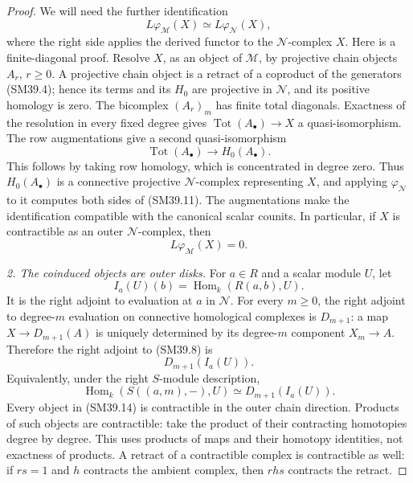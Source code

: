 \begin{proof}
We will need the further identification
\[
       L\varphi_{\mathcal M}(X)
                         \simeq L\varphi_{\mathcal N}(X),     \tag{SM39.11}
\]
where the right side applies the derived functor to the
\(\mathcal N\)-complex \(X\).  Here is a finite-diagonal
proof.  Resolve \(X\), as an object of \(\mathcal M\), by
projective chain objects \(A_r\), \(r\ge0\).  A projective
chain object is a retract of a coproduct of the generators
(SM39.4); hence its terms and its \(H_0\) are projective
in \(\mathcal N\), and its positive homology is zero.
The bicomplex \((A_r)_m\) has finite total diagonals.
Exactness of the resolution in every fixed degree gives
\(\operatorname{Tot}(A_\bullet)\to X\) a quasi-isomorphism.
The row augmentations give a second quasi-isomorphism
\[
          \operatorname{Tot}(A_\bullet)
                            \longrightarrow H_0(A_\bullet).
\]
This follows by taking row homology, which is concentrated
in degree zero.  Thus \(H_0(A_\bullet)\) is a connective
projective \(\mathcal N\)-complex representing \(X\), and
applying \(\varphi_{\mathcal N}\) to it computes both sides
of (SM39.11).  The augmentations make the identification
compatible with the canonical scalar counits.  In particular,
if \(X\) is contractible as an outer \(\mathcal N\)-complex,
then
\[
                            L\varphi_{\mathcal M}(X)=0.       \tag{SM39.12}
\]

\emph{2. The coinduced objects are outer disks.}
For \(a\in R\) and a scalar module \(U\), let
\[
             I_a(U)(b)=\operatorname{Hom}_k(R(a,b),U).
\]
It is the right adjoint to evaluation at \(a\) in
\(\mathcal N\).  For every \(m\ge0\), the right adjoint
to degree-\(m\) evaluation on connective homological
complexes is \(D_{m+1}\): a map
\(X\to D_{m+1}(A)\) is uniquely determined by its degree-\(m\)
component \(X_m\to A\).  Therefore the right adjoint to
(SM39.8) is
\[
                        D_{m+1}(I_a(U)).                    \tag{SM39.13}
\]
Equivalently, under the right \(S\)-module description,
\[
 \operatorname{Hom}_k(S((a,m),-),U)
                   \simeq D_{m+1}(I_a(U)).                  \tag{SM39.14}
\]
Every object in (SM39.14) is contractible in the outer chain
direction.  Products of such objects are contractible:
take the product of their contracting homotopies degree by
degree.  This uses products of maps and their homotopy
identities, not exactness of products.  A retract of a
contractible complex is contractible as well: if \(rs=1\)
and \(h\) contracts the ambient complex, then \(rhs\)
contracts the retract.


\end{proof}
